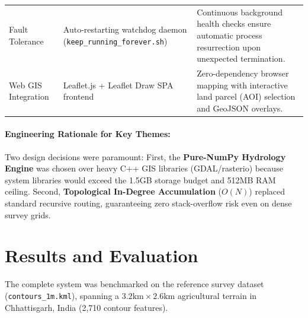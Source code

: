 \documentclass[manuscript,screen,review]{acmart}
\begin{document}
\begin{table}[t]
\begin{tabularx}{\linewidth}{p{3.2cm}p{5.4cm}X}
    Fault Tolerance & Auto-restarting watchdog daemon (\texttt{keep\_running\_forever.sh}) & Continuous background health checks ensure automatic process resurrection upon unexpected termination. \\
    Web GIS Integration & Leaflet.js + Leaflet Draw SPA frontend & Zero-dependency browser mapping with interactive land parcel (AOI) selection and GeoJSON overlays. \\
    \bottomrule
  \end{tabularx}
\end{table}

\paragraph{Engineering Rationale for Key Themes:}
Two design decisions were paramount: First, the \textbf{Pure-NumPy Hydrology Engine} was chosen over heavy C++ GIS libraries (GDAL/rasterio) because system libraries would exceed the 1.5GB storage budget and 512MB RAM ceiling. Second, \textbf{Topological In-Degree Accumulation} ($O(N)$) replaced standard recursive routing, guaranteeing zero stack-overflow risk even on dense survey grids.

\section{Results and Evaluation}
\label{sec:results}

The complete system was benchmarked on the reference survey dataset (\texttt{contours\_1m.kml}), spanning a $3.2\text{km} \times 2.6\text{km}$ agricultural terrain in Chhattisgarh, India (2,710 contour features).
\end{document}
